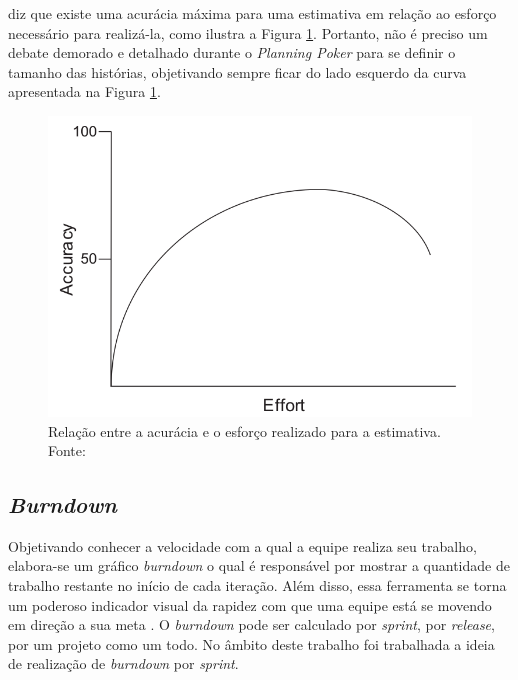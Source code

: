 	 diz que existe uma acurácia máxima para uma estimativa
	em relação ao esforço necessário para realizá-la, como ilustra a Figura \ref{fig:effort_accuracy}.
	Portanto, não é preciso um debate demorado e detalhado durante o \textit{Planning Poker} para se definir
	o tamanho das histórias, objetivando sempre ficar do lado esquerdo da curva apresentada na Figura \ref{fig:effort_accuracy}.

	\begin{figure}[!htb]
	  \centering
	  \includegraphics[scale=0.4]{figuras/effort_accuracy}
	  \caption[Relação entre a acurácia e o esforço realizado para a estimativa.]
		  {Relação entre a acurácia e o esforço realizado para a estimativa. Fonte: \cite{cohn06}}
	  \label{fig:effort_accuracy}
	\end{figure}

  \subsection{\textit{Burndown}}

    Objetivando conhecer a velocidade com a qual a equipe realiza seu trabalho, elabora-se um gráfico \textit{burndown} o qual é responsável por mostrar a quantidade de trabalho restante no início de cada iteração. Além disso, essa ferramenta se torna um poderoso indicador visual da rapidez com que uma equipe está se movendo em direção a sua meta \cite{cohn06}. O \textit{burndown} pode ser calculado por \textit{sprint}, por \textit{release}, por um projeto como um todo. No âmbito deste trabalho foi trabalhada a ideia de realização de \textit{burndown} por \textit{sprint}.


